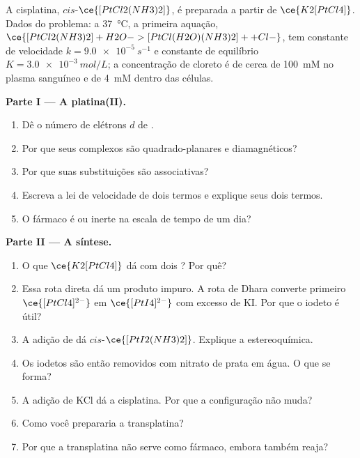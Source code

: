\begin{problem}
\label{pb:b3:complex-mechanisms:1}
A cisplatina, $cis$-$\ce{[PtCl2(NH3)2]}$, é preparada a partir de $\ce{K2[PtCl4]}$. Dados do problema: a
\qty{37}{\celsius}, a primeira aquação, $\ce{[PtCl2(NH3)2] + H2O -> [PtCl(H2O)(NH3)2]+ + Cl-}$, tem
constante de velocidade $k = \qty{9.0e-5}{s^{-1}}$ e constante de equilíbrio $K = \qty{3.0e-3}{mol/L}$; a
concentração de cloreto é de cerca de \qty{100}{mM} no plasma sanguíneo e de \qty{4}{mM} dentro das células.

\medskip\noindent\textbf{Parte I --- A platina(II).}
\begin{enumerate}
  \item Dê o número de elétrons $d$ de .
  \item Por que seus complexos são quadrado-planares e diamagnéticos?
  \item Por que suas substituições são associativas?
  \item Escreva a lei de velocidade de dois termos e explique seus dois termos.
  \item O fármaco é  ou inerte na escala de tempo de um dia?
\end{enumerate}

\medskip\noindent\textbf{Parte II --- A síntese.}
\begin{enumerate}[resume]
  \item O que $\ce{K2[PtCl4]}$ dá com dois ? Por quê?
  \item Essa rota direta dá um produto impuro. A rota de Dhara converte primeiro
        $\ce{[PtCl4]^{2-}}$ em $\ce{[PtI4]^{2-}}$ com excesso de KI. Por que o iodeto é útil?
  \item A adição de  dá $cis$-$\ce{[PtI2(NH3)2]}$. Explique a estereoquímica.
  \item Os iodetos são então removidos com nitrato de prata em água. O que se forma?
  \item A adição de KCl dá a cisplatina. Por que a configuração não muda?
  \item Como você prepararia a transplatina?
  \item Por que a transplatina não serve como fármaco, embora também reaja?
\end{enumerate}


\end{problem}
